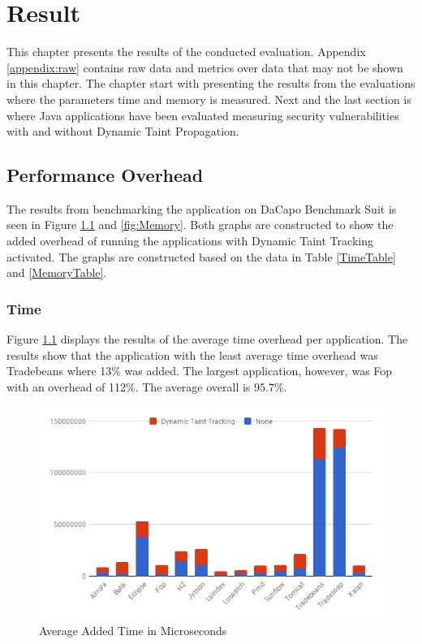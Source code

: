 \chapter{Result}
This chapter presents the results of the conducted evaluation. Appendix \ref{appendix:raw} contains raw data and metrics over data that may not be shown in this chapter. The chapter start with presenting the results from the \textit{} evaluations where the parameters time and memory is measured. Next and the last section is \textit{} where Java applications have been evaluated measuring security vulnerabilities with and without Dynamic Taint Propagation.



\section{Performance Overhead}
\label{Performance}
The results from benchmarking the application on DaCapo Benchmark Suit \parencite{dacapo} is seen in Figure \ref{fig:Time} and \ref{fig:Memory}. Both graphs are constructed to show the added overhead of running the applications with Dynamic Taint Tracking activated. The graphs are constructed based on the data in Table \ref{TimeTable} and \ref{MemoryTable}.



\subsection{Time}
Figure \ref{fig:Time} displays the results of the average time overhead per application. The results show that the application with the least average time overhead was Tradebeans where 13\% was added. The largest application, however, was Fop with an overhead of 112\%. The average overall is 95.7\%.

\begin{figure}[!hbt]
    \centering
    \includegraphics[width=\textwidth]{images/Time.png}
    \caption{Average Added Time in Microseconds}
    \label{fig:Time}
\end{figure}



